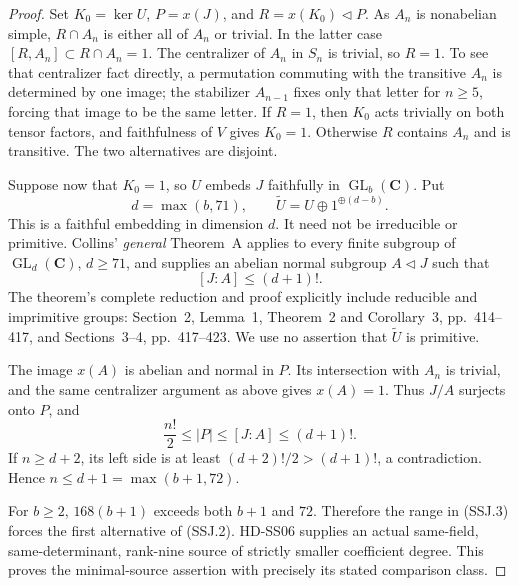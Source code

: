 \begin{proof}
Set \(K_0=\ker U\), \(P=x(J)\), and \(R=x(K_0)\lhd P\).
As \(A_n\) is nonabelian simple, \(R\cap A_n\) is either all
of \(A_n\) or trivial. In the latter case
\([R,A_n]\subset R\cap A_n=1\). The centralizer of \(A_n\)
in \(S_n\) is trivial, so \(R=1\). To see that centralizer
fact directly, a permutation commuting with the transitive
\(A_n\) is determined by one image; the stabilizer \(A_{n-1}\)
fixes only that letter for \(n\ge5\), forcing that image to be
the same letter.
If \(R=1\), then \(K_0\) acts trivially on both tensor factors,
and faithfulness of \(V\) gives \(K_0=1\). Otherwise \(R\)
contains \(A_n\) and is transitive. The two alternatives are
disjoint.

Suppose now that \(K_0=1\), so \(U\) embeds \(J\) faithfully
in \(\operatorname{GL}_b(\mathbf C)\). Put
\[
                  d=\max(b,71),\qquad
                  \widetilde U=U\oplus1^{\oplus(d-b)}.
 \tag{SSJ.4}
\]
This is a faithful embedding in dimension \(d\). It need not be
irreducible or primitive. Collins' \emph{general} Theorem~A
\cite[p.~412]{HD:Collins2007} applies to every finite subgroup
of \(\operatorname{GL}_d(\mathbf C)\), \(d\ge71\), and supplies
an abelian normal subgroup \(A\lhd J\) such that
\[
                            [J:A]\le(d+1)!.
 \tag{SSJ.5}
\]
The theorem's complete reduction and proof explicitly include
reducible and imprimitive groups: Section~2, Lemma~1,
Theorem~2 and Corollary~3, pp.~414--417, and Sections~3--4,
pp.~417--423. We use no assertion that \(\widetilde U\)
is primitive.

The image \(x(A)\) is abelian and normal in \(P\). Its intersection
with \(A_n\) is trivial, and the same centralizer argument as above
gives \(x(A)=1\). Thus \(J/A\) surjects onto \(P\), and
\[
                    \frac{n!}{2}\le |P|\le[J:A]\le(d+1)!.
 \tag{SSJ.6}
\]
If \(n\ge d+2\), its left side is at least
\((d+2)!/2>(d+1)!\), a contradiction. Hence
\(n\le d+1=\max(b+1,72)\).

For \(b\ge2\), \(168(b+1)\) exceeds both \(b+1\) and \(72\).
Therefore the range in (SSJ.3) forces the first alternative of
(SSJ.2). HD-SS06 supplies an actual same-field, same-determinant,
rank-nine source of strictly smaller coefficient degree. This
proves the minimal-source assertion with precisely its stated
comparison class.
\end{proof}

